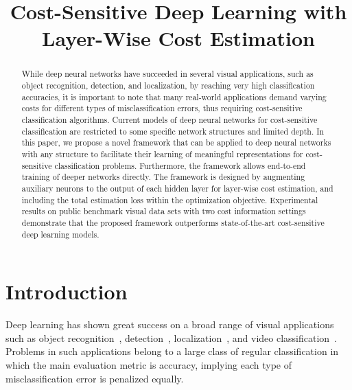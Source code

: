 \documentclass[a4paper]{article}
\title{Cost-Sensitive Deep Learning with Layer-Wise Cost Estimation}
\begin{document}
\maketitle
\begin{abstract}
  While deep neural networks have succeeded in several visual applications, such as object recognition, detection, and localization, by reaching very high classification accuracies, it is important to note that many real-world applications demand varying costs for different types of misclassification errors, thus requiring cost-sensitive classification algorithms.
  Current models of deep neural networks for cost-sensitive classification are restricted to some specific network structures and limited depth. 
  In this paper, we propose a novel framework that can be applied to deep neural networks with any structure to facilitate their learning of meaningful representations for cost-sensitive classification problems.
  Furthermore, the framework allows end-to-end training of deeper networks directly.
  The framework is designed by augmenting auxiliary neurons to the output of each hidden layer for layer-wise cost estimation, and including the total estimation loss within the optimization objective.
  Experimental results on public benchmark visual data sets with two cost information settings demonstrate that the proposed framework outperforms state-of-the-art cost-sensitive deep learning models.
\end{abstract}


\section{Introduction}
  Deep learning has shown great success on a broad range of visual applications such as object recognition~\cite{ciregan2012multi,simonyan2014very,he2015deep}, detection~\cite{szegedy2013deep,erhan2014scalable,zhang2015improving}, localization~\cite{sermanet2013overfeat,lin2015deep}, and video classification~\cite{karpathy2014large,ye2015evaluating,yue2015beyond}.
  Problems in such applications belong to a large class of regular classification in which the main evaluation metric is accuracy, implying each type of misclassification error is penalized equally.
\end{document}
